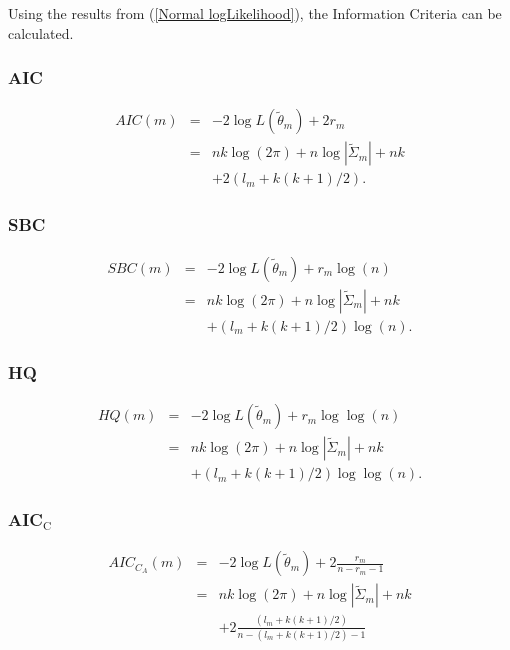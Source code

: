 Using the results from (\ref{Normal logLikelihood}), the Information
Criteria can be calculated.


\subsubsection{AIC}

\begin{eqnarray*}
AIC\left(m\right) & = & -2\log L\left(\widetilde{\theta}_{m}\right)+2r_{m}\\
 & = & nk\log\left(2\pi\right)+n\log\left\vert \widetilde{\Sigma}_{m}\right\vert +nk\\
 &  & +2\left(l_{m}+k\left(k+1\right)/2\right).
\end{eqnarray*}



\subsubsection{SBC}

\begin{eqnarray*}
SBC\left(m\right) & = & -2\log L\left(\widetilde{\theta}_{m}\right)+r_{m}\log\left(n\right)\\
 & = & nk\log\left(2\pi\right)+n\log\left\vert \widetilde{\Sigma}_{m}\right\vert +nk\\
 &  & +\left(l_{m}+k\left(k+1\right)/2\right)\log\left(n\right).
\end{eqnarray*}



\subsubsection{HQ}

\begin{eqnarray*}
HQ\left(m\right) & = & -2\log L\left(\widetilde{\theta}_{m}\right)+r_{m}\log\log\left(n\right)\\
 & = & nk\log\left(2\pi\right)+n\log\left\vert \widetilde{\Sigma}_{m}\right\vert +nk\\
 &  & +\left(l_{m}+k\left(k+1\right)/2\right)\log\log\left(n\right).
\end{eqnarray*}



\subsubsection{AIC$_{\text{C}}$}

\begin{eqnarray*}
AIC_{C_{A}}\left(m\right) & = & -2\log L\left(\widetilde{\theta}_{m}\right)+2\frac{r_{m}}{n-r_{m}-1}\\
 & = & nk\log\left(2\pi\right)+n\log\left\vert \widetilde{\Sigma}_{m}\right\vert +nk\\
 &  & +2\frac{\left(l_{m}+k\left(k+1\right)/2\right)}{n-\left(l_{m}+k\left(k+1\right)/2\right)-1}
\end{eqnarray*}


